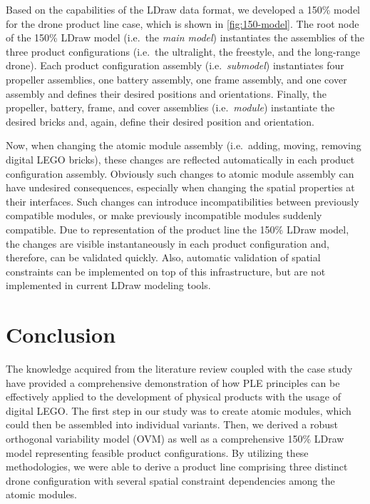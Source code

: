\documentclass[sigconf,review]{acmart}
\begin{document}
Based on the capabilities of the LDraw data format, we developed a 150\% model for the drone product line case, which is shown in \cref{fig:150-model}.
The root node of the 150\% LDraw model (i.e.\ the \textit{main model}) instantiates the assemblies of the three product configurations (i.e.\ the ultralight, the freestyle, and the long-range drone).
Each product configuration assembly (i.e.\ \textit{submodel}) instantiates four propeller assemblies, one battery assembly, one frame assembly, and one cover assembly and defines their desired positions and orientations.
Finally, the propeller, battery, frame, and cover assemblies (i.e.\ \textit{module}) instantiate the desired bricks and, again, define their desired position and orientation.

Now, when changing the atomic module assembly (i.e.\ adding, moving, removing digital LEGO bricks), these changes are reflected automatically in each product configuration assembly.
Obviously such changes to atomic module assembly can have undesired consequences, especially when changing the spatial properties at their interfaces.
Such changes can introduce incompatibilities between previously compatible modules, or make previously incompatible modules suddenly compatible.
Due to representation of the product line the 150\% LDraw model, the changes are visible instantaneously in each product configuration and, therefore, can be validated quickly.
Also, automatic validation of spatial constraints can be implemented on top of this infrastructure, but are not implemented in current LDraw modeling tools.

\section{Conclusion}
\label{sec:conclusion}

The knowledge acquired from the literature review coupled with the case study have provided a comprehensive demonstration of how PLE principles can be effectively applied to the development of physical products with the usage of digital LEGO. 
The first step in our study was to create atomic modules, which could then be assembled into individual variants. 
Then, we derived a robust orthogonal variability model (OVM) as well as a comprehensive 150\% LDraw model representing feasible product configurations. 
By utilizing these methodologies, we were able to derive a product line comprising three distinct drone configuration with several spatial constraint dependencies among the atomic modules.
\end{document}
